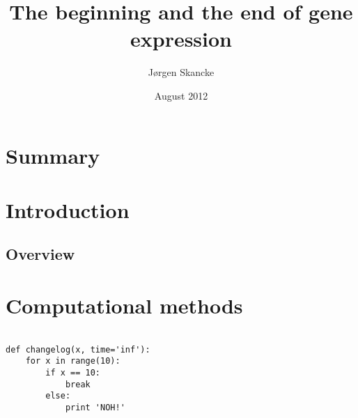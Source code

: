 \documentclass[]{ntnuthesis}
\title{The beginning and the end of gene expression}
\author{Jørgen Skancke}
\date{August 2012}
\begin{document}
 

\frontmatter

\maketitle
\chapter*{Summary}
\noindent
	
\clearpage


%

\tableofcontents

\mainmatter

\chapter{Introduction}
\section{Overview}

\FloatBarrier
\newpage


\chapter{Computational methods}
\begin{verbatim}

def changelog(x, time='inf'):
    for x in range(10):
        if x == 10:
            break
        else:
            print 'NOH!'

\end{verbatim}

%
%
%
\newpage
\end{document}
